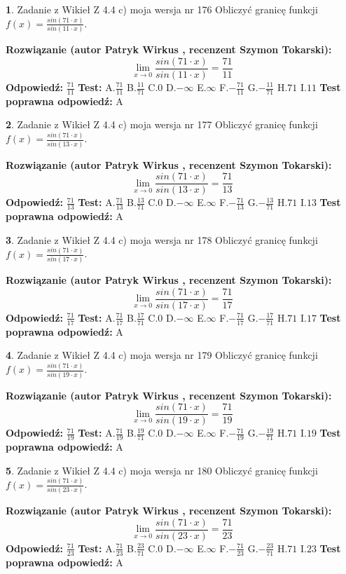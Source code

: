 \documentclass[12pt, a4paper]{article}
\theoremstyle{definition} %
\newtheorem{zad}{}
\newcommand{\zadStart}[1]{\begin{zad}#1\newline}
\newcommand{\zadStop}{\end{zad}}
\newcommand{\rozwStart}[2]{\noindent \textbf{Rozwiązanie (autor #1 , recenzent #2): }\newline}
\newcommand{\rozwStop}{\newline}
\newcommand{\odpStart}{\noindent \textbf{Odpowiedź:}\newline}
\newcommand{\odpStop}{\newline}
\newcommand{\testStart}{\noindent \textbf{Test:}\newline}
\newcommand{\testStop}{\newline}
\newcommand{\kluczStart}{\noindent \textbf{Test poprawna odpowiedź:}\newline}
\newcommand{\kluczStop}{\newline}
\begin{document}
\zadStart{Zadanie z Wikieł Z 4.4 c) moja wersja nr 176}
Obliczyć granicę funkcji $f(x)=\frac{sin(71\cdot x)}{sin(11\cdot x)}$.
\zadStop
\rozwStart{Patryk Wirkus}{Szymon Tokarski}
$$\lim\limits_{x\to 0}\frac{sin(71\cdot x)}{sin(11\cdot x)}=
\frac{71}{11}$$
\rozwStop
\odpStart
$\frac{71}{11}$
\odpStop
\testStart
A.$\frac{71}{11}$
B.$\frac{11}{71}$
C.$0$
D.$-\infty$
E.$\infty$
F.$-\frac{71}{11}$
G.$-\frac{11}{71}$
H.$71$
I.$11$
\testStop
\kluczStart
A
\kluczStop



\zadStart{Zadanie z Wikieł Z 4.4 c) moja wersja nr 177}
Obliczyć granicę funkcji $f(x)=\frac{sin(71\cdot x)}{sin(13\cdot x)}$.
\zadStop
\rozwStart{Patryk Wirkus}{Szymon Tokarski}
$$\lim\limits_{x\to 0}\frac{sin(71\cdot x)}{sin(13\cdot x)}=
\frac{71}{13}$$
\rozwStop
\odpStart
$\frac{71}{13}$
\odpStop
\testStart
A.$\frac{71}{13}$
B.$\frac{13}{71}$
C.$0$
D.$-\infty$
E.$\infty$
F.$-\frac{71}{13}$
G.$-\frac{13}{71}$
H.$71$
I.$13$
\testStop
\kluczStart
A
\kluczStop



\zadStart{Zadanie z Wikieł Z 4.4 c) moja wersja nr 178}
Obliczyć granicę funkcji $f(x)=\frac{sin(71\cdot x)}{sin(17\cdot x)}$.
\zadStop
\rozwStart{Patryk Wirkus}{Szymon Tokarski}
$$\lim\limits_{x\to 0}\frac{sin(71\cdot x)}{sin(17\cdot x)}=
\frac{71}{17}$$
\rozwStop
\odpStart
$\frac{71}{17}$
\odpStop
\testStart
A.$\frac{71}{17}$
B.$\frac{17}{71}$
C.$0$
D.$-\infty$
E.$\infty$
F.$-\frac{71}{17}$
G.$-\frac{17}{71}$
H.$71$
I.$17$
\testStop
\kluczStart
A
\kluczStop



\zadStart{Zadanie z Wikieł Z 4.4 c) moja wersja nr 179}
Obliczyć granicę funkcji $f(x)=\frac{sin(71\cdot x)}{sin(19\cdot x)}$.
\zadStop
\rozwStart{Patryk Wirkus}{Szymon Tokarski}
$$\lim\limits_{x\to 0}\frac{sin(71\cdot x)}{sin(19\cdot x)}=
\frac{71}{19}$$
\rozwStop
\odpStart
$\frac{71}{19}$
\odpStop
\testStart
A.$\frac{71}{19}$
B.$\frac{19}{71}$
C.$0$
D.$-\infty$
E.$\infty$
F.$-\frac{71}{19}$
G.$-\frac{19}{71}$
H.$71$
I.$19$
\testStop
\kluczStart
A
\kluczStop



\zadStart{Zadanie z Wikieł Z 4.4 c) moja wersja nr 180}
Obliczyć granicę funkcji $f(x)=\frac{sin(71\cdot x)}{sin(23\cdot x)}$.
\zadStop
\rozwStart{Patryk Wirkus}{Szymon Tokarski}
$$\lim\limits_{x\to 0}\frac{sin(71\cdot x)}{sin(23\cdot x)}=
\frac{71}{23}$$
\rozwStop
\odpStart
$\frac{71}{23}$
\odpStop
\testStart
A.$\frac{71}{23}$
B.$\frac{23}{71}$
C.$0$
D.$-\infty$
E.$\infty$
F.$-\frac{71}{23}$
G.$-\frac{23}{71}$
H.$71$
I.$23$
\testStop
\kluczStart
A
\kluczStop
\end{document}
